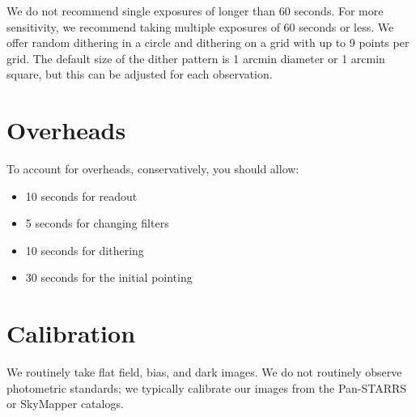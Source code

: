 We do not recommend single exposures of longer than 60 seconds. For more sensitivity, we recommend taking multiple exposures of 60 seconds or less. We offer random dithering in a circle and dithering on a grid with up to 9 points per grid. The default size of the dither pattern is 1 arcmin diameter or 1 arcmin square, but this can be adjusted for each observation.

\section{Overheads}

To account for overheads, conservatively, you should allow:
\begin{itemize}
\item 10 seconds for readout
\item 5 seconds for changing filters
\item 10 seconds for dithering
\item 30 seconds for the initial pointing
\end{itemize}

\section{Calibration}

We routinely take flat field, bias, and dark images. We do not routinely observe photometric standards; we typically calibrate our images from the Pan-STARRS or SkyMapper catalogs.